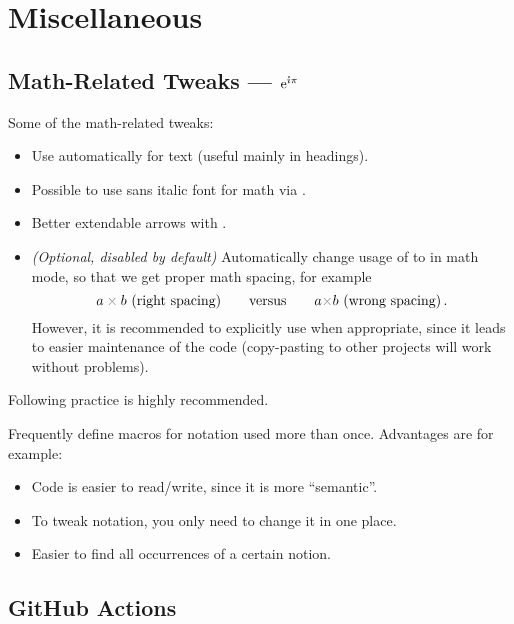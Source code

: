 \section{Miscellaneous}%
\label{sec:Miscellaneous}

\subsection{Math-Related Tweaks --- \texorpdfstring{\(\E^{\I\pi}\)}{exp(iπ)}}%
\label{sub:Math Macros}

Some of the math-related tweaks:
\begin{itemize}
    \item Use \macro{\boldmath} automatically for \macro{\textbf} text (useful mainly in headings).
    \item Possible to use sans italic font for math via \custommacro{\mathsfit}.
    \item Better extendable arrows with .
    \item \emph{(Optional, disabled by default)} Automatically change usage of \macro{\textcolor} to \macro{\mathcolor} in math mode, so that we get proper math spacing, for example
          \[ a \mathcolor{gray}{\times} b \text{ (right spacing)} \qquad\text{versus}\qquad a \textcolor{gray}{\times} b \text{ (wrong spacing)}\eqend \]
          However, it is recommended to explicitly use \macro{\mathcolor} when appropriate, since it leads to easier maintenance of the code (copy-pasting to other projects will work without problems).
\end{itemize}

\vspace{1ex}
Following practice is highly recommended.
\begin{tip}
    Frequently define macros for notation used more than once. Advantages are for example:
    \begin{itemize}
        \item Code is easier to read/write, since it is more \enquote{semantic}.
        \item To tweak notation, you only need to change it in one place.
        \item Easier to find all occurrences of a certain notion. \qedhere
    \end{itemize}
\end{tip}

\subsection{GitHub Actions}%
\label{sub:GitHub Actions}

